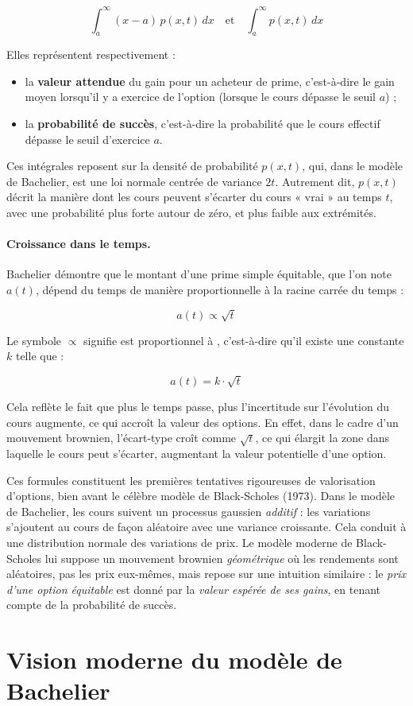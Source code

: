 \documentclass[12pt,a4paper]{article}
\begin{document}
\[
\int_a^{\infty} (x - a)\, p(x,t)\, dx
\quad \text{et} \quad
\int_a^{\infty} p(x,t)\, dx
\]

Elles représentent respectivement :
\begin{itemize}
    \item la \textbf{valeur attendue} du gain pour un acheteur de prime, c’est-à-dire le gain moyen lorsqu’il y a exercice de l’option (lorsque le cours dépasse le seuil \( a \)) ;
    \item la \textbf{probabilité de succès}, c’est-à-dire la probabilité que le cours effectif dépasse le seuil d’exercice \( a \).
\end{itemize}

Ces intégrales reposent sur la densité de probabilité \( p(x,t) \), qui, dans le modèle de Bachelier, est une loi normale centrée de variance \( 2t \). Autrement dit, \( p(x,t) \) décrit la manière dont les cours peuvent s’écarter du cours « vrai » au temps \( t \), avec une probabilité plus forte autour de zéro, et plus faible aux extrémités.

\paragraph{Croissance dans le temps.}

Bachelier démontre que le montant d’une prime simple équitable, que l’on note \( a(t) \), dépend du temps de manière proportionnelle à la racine carrée du temps :

\[
a(t) \propto \sqrt{t}
\]

Le symbole \( \propto \) signifie \og est proportionnel à \fg, c’est-à-dire qu’il existe une constante \( k \) telle que :

\[
a(t) = k \cdot \sqrt{t}
\]

Cela reflète le fait que plus le temps passe, plus l’incertitude sur l’évolution du cours augmente, ce qui accroît la valeur des options. En effet, dans le cadre d’un mouvement brownien, l’écart-type croît comme \( \sqrt{t} \), ce qui élargit la zone dans laquelle le cours peut s’écarter, augmentant la valeur potentielle d’une option.

\bigskip

Ces formules constituent les premières tentatives rigoureuses de valorisation d'options, bien avant le célèbre modèle de Black-Scholes (1973). Dans le modèle de Bachelier, les cours suivent un processus gaussien \textit{additif} : les variations s'ajoutent au cours de façon aléatoire avec une variance croissante. Cela conduit à une distribution normale des variations de prix.
Le modèle moderne de Black-Scholes lui suppose un mouvement brownien \textit{géométrique} où les rendements sont aléatoires, pas les prix eux-mêmes, mais repose sur une intuition similaire : le \textit{prix d'une option équitable} est donné par la \textit{valeur espérée de ses gains}, en tenant compte de la probabilité de succès.


\section{Vision moderne du modèle de Bachelier}
\end{document}
